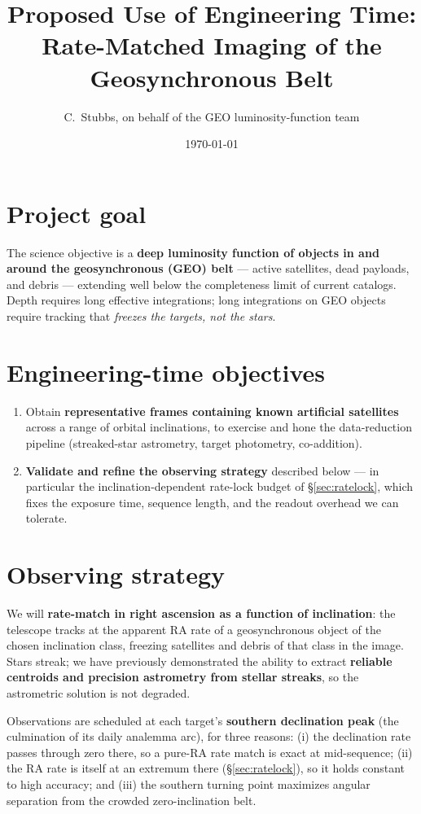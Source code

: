 \documentclass[11pt]{article}
\title{Proposed Use of Engineering Time:\\
Rate-Matched Imaging of the Geosynchronous Belt}
\author{C.~Stubbs, on behalf of the GEO luminosity-function team}
\date{\today}
\begin{document}
\maketitle

\section{Project goal}

The science objective is a \textbf{deep luminosity function of objects in and around the
geosynchronous (GEO) belt} --- active satellites, dead payloads, and debris --- extending
well below the completeness limit of current catalogs. Depth requires long effective
integrations; long integrations on GEO objects require tracking that \emph{freezes the
targets, not the stars}.

\section{Engineering-time objectives}

\begin{enumerate}
  \item Obtain \textbf{representative frames containing known artificial satellites} across
        a range of orbital inclinations, to exercise and hone the data-reduction pipeline
        (streaked-star astrometry, target photometry, co-addition).
  \item \textbf{Validate and refine the observing strategy} described below --- in
        particular the inclination-dependent rate-lock budget of
        \S\ref{sec:ratelock}, which fixes the exposure time, sequence length, and the
        readout overhead we can tolerate.
\end{enumerate}

\section{Observing strategy}

We will \textbf{rate-match in right ascension as a function of inclination}: the telescope
tracks at the apparent RA rate of a geosynchronous object of the chosen inclination class,
freezing satellites and debris of that class in the image. Stars streak; we have
previously demonstrated the ability to extract \textbf{reliable centroids and precision
astrometry from stellar streaks}, so the astrometric solution is not degraded.

Observations are scheduled at each target's \textbf{southern declination peak} (the
culmination of its daily analemma arc), for three reasons:
(i) the declination rate passes through zero there, so a pure-RA rate match is exact at
mid-sequence; (ii) the RA rate is itself at an extremum there (\S\ref{sec:ratelock}),
so it holds constant to high accuracy; and (iii) the southern turning point maximizes
angular separation from the crowded zero-inclination belt.
\end{document}
